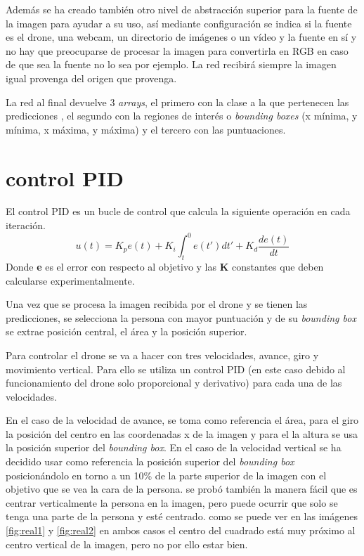 Además se ha creado también otro nivel de abstracción superior para la fuente de la imagen para ayudar a su uso, así mediante configuración se indica si la fuente es el drone, una webcam, un directorio de imágenes o un vídeo y la fuente en sí y no hay que preocuparse de procesar la imagen para convertirla en RGB en caso de que sea la fuente no lo sea por ejemplo. La red recibirá siempre la imagen igual provenga del origen que provenga.

La red al final devuelve 3 \textit{arrays}, el primero con la clase a la que pertenecen las predicciones , el segundo con la regiones de interés o \textit{bounding boxes} (x mínima, y mínima, x máxima, y máxima) y el tercero con las puntuaciones.

\section{control PID}
El control PID es un bucle de control que calcula la siguiente operación en cada iteración.
\[ u(t) = K_p e(t) + K_i \int_{t}^{0} e(t') dt' + K_d \frac{de(t)}{dt}\]
Donde \textbf{e} es el error con respecto al objetivo y las \textbf{K} constantes que deben calcularse experimentalmente.

Una vez que se procesa la imagen recibida por el drone y se tienen las predicciones, se selecciona la persona con mayor puntuación y de su \textit{bounding box} se extrae posición central, el área y la posición superior.

Para controlar el drone se va a hacer con tres velocidades, avance, giro y movimiento vertical. Para ello se utiliza un control PID (en este caso debido al funcionamiento del drone solo proporcional y derivativo) para cada una de las velocidades.

En el caso de la velocidad de avance, se toma como referencia el área, para el giro la posición del centro en las coordenadas x de la imagen y para el la altura se usa la posición superior del \textit{bounding box}.
En el caso de la velocidad vertical se ha decidido usar como referencia la posición superior del \textit{bounding box} posicionándolo en torno a un 10\% de la parte superior de la imagen con el objetivo que se vea la cara de la persona. se probó también la manera fácil que es centrar verticalmente la persona en la imagen, pero puede ocurrir que solo se tenga una parte de la persona y esté centrado. como se puede ver en las imágenes \ref{fig:real1} y \ref{fig:real2} en ambos casos el centro del cuadrado está muy próximo al centro vertical de la imagen, pero no por ello estar bien.

